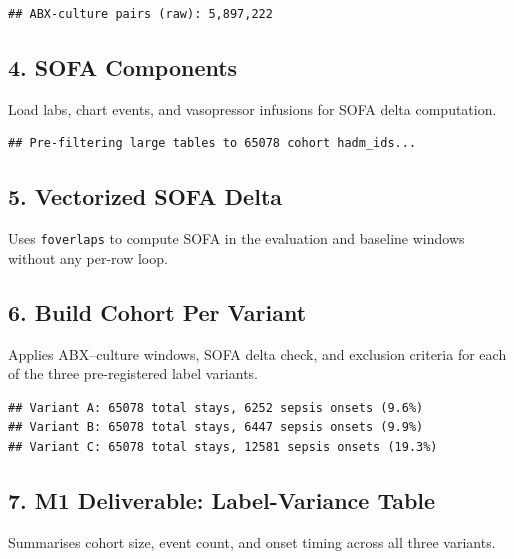 \documentclass[
  11pt,
]{article}
\begin{document}
\begin{verbatim}
## ABX-culture pairs (raw): 5,897,222
\end{verbatim}

\subsection{4. SOFA Components}\label{sofa-components}

Load labs, chart events, and vasopressor infusions for SOFA delta computation.

\begin{verbatim}
## Pre-filtering large tables to 65078 cohort hadm_ids...
\end{verbatim}

\subsection{5. Vectorized SOFA Delta}\label{vectorized-sofa-delta}

Uses \texttt{foverlaps} to compute SOFA in the evaluation and baseline windows without any per-row loop.

\subsection{6. Build Cohort Per Variant}\label{build-cohort-per-variant}

Applies ABX--culture windows, SOFA delta check, and exclusion criteria for each of the three pre-registered label variants.

\begin{verbatim}
## Variant A: 65078 total stays, 6252 sepsis onsets (9.6%)
## Variant B: 65078 total stays, 6447 sepsis onsets (9.9%)
## Variant C: 65078 total stays, 12581 sepsis onsets (19.3%)
\end{verbatim}

\subsection{7. M1 Deliverable: Label-Variance Table}\label{m1-deliverable-label-variance-table}

Summarises cohort size, event count, and onset timing across all three variants.
\end{document}
